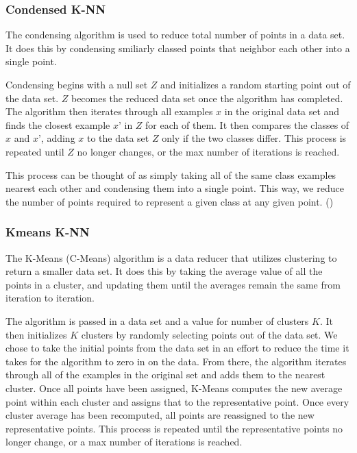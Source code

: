 \documentclass[twoside,11pt]{article}
\begin{document}
\subsubsection{Condensed K-NN}

The condensing algorithm is used to reduce total number of points in a data set. It does this by condensing smiliarly classed points that neighbor each other into a single point.

Condensing begins with a null set $Z$ and initializes a random starting point out of the data set. $Z$ becomes the reduced data set once the algorithm has completed. The algorithm then iterates through all examples $x$ in the original data set and finds the closest example $x’$ in $Z$ for each of them. It then compares the classes of $x$ and $x’$, adding $x$ to the data set $Z$ only if the two classes differ. This process is repeated until $Z$ no longer changes, or the max number of iterations is reached.

This process can be thought of as simply taking all of the same class examples nearest each other and condensing them into a single point. This way, we reduce the number of points required to represent a given class at any given point. (\cite{Condensed})

\subsubsection{Kmeans K-NN}

The K-Means (C-Means) algorithm is a data reducer that utilizes clustering to return a smaller data set. It does this by taking the average value of all the points in a cluster, and updating them until the averages remain the same from iteration to iteration.

The algorithm is passed in a data set and a value for number of clusters $K$. It then initializes $K$ clusters by randomly selecting points out of the data set. We chose to take the initial points from the data set in an effort to reduce the time it takes for the algorithm to zero in on the data. From there, the algorithm iterates through all of the examples in the original set and adds them to the nearest cluster. Once all points have been assigned, K-Means computes the new average point within each cluster and assigns that to the representative point. Once every cluster average has been recomputed, all points are reassigned to the new representative points. This process is repeated until the representative points no longer change, or a max number of iterations is reached.
\end{document}
